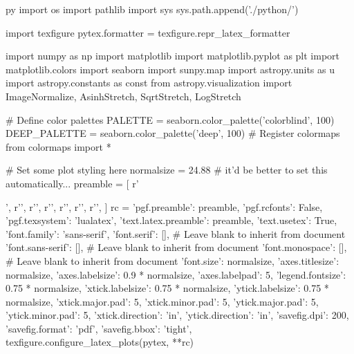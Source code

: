 \begin{pythontexcustomcode}{py}
import os
import pathlib
import sys
sys.path.append('./python/')

import texfigure
pytex.formatter = texfigure.repr_latex_formatter

import numpy as np
import matplotlib
import matplotlib.pyplot as plt
import matplotlib.colors
import seaborn
import sunpy.map
import astropy.units as u
import astropy.constants as const
from astropy.visualization import ImageNormalize, AsinhStretch, SqrtStretch, LogStretch

# Define color palettes
PALETTE = seaborn.color_palette('colorblind', 100)
DEEP_PALETTE = seaborn.color_palette('deep', 100)
# Register colormaps
from colormaps import *

# Set some plot styling here
normalsize = 24.88  # it'd be better to set this automatically...
preamble = [
	r'\usepackage{siunitx}',
	r'\DeclareSIUnit[number-unit-product={}]',
	r'\DeclareSIUnit[number-unit-product={}]',
	r'\DeclareSIUnit[number-unit-product={}]',
	r'\DeclareSIUnit[number-unit-product={}]',
	r'\DeclareSIUnit[number-unit-product={}]',
	r'\DeclareSIUnit[number-unit-product={}]',
]
rc = {
	'pgf.preamble': preamble,
	'pgf.rcfonts': False,
	'pgf.texsystem': 'lualatex',
	'text.latex.preamble': preamble,
	'text.usetex': True,
	'font.family': 'sans-serif',
	'font.serif': [], # Leave blank to inherit from document
	'font.sans-serif': [], # Leave blank to inherit from document
	'font.monospace': [], # Leave blank to inherit from document
	'font.size': normalsize,
	'axes.titlesize': normalsize,
	'axes.labelsize': 0.9 * normalsize,
	'axes.labelpad': 5,
	'legend.fontsize': 0.75 * normalsize,
	'xtick.labelsize': 0.75 * normalsize,
	'ytick.labelsize': 0.75 * normalsize,
	'xtick.major.pad': 5,
	'xtick.minor.pad': 5,
	'ytick.major.pad': 5,
	'ytick.minor.pad': 5,
	'xtick.direction': 'in',
	'ytick.direction': 'in',
	'savefig.dpi': 200,
	'savefig.format': 'pdf',
	'savefig.bbox': 'tight',
}
texfigure.configure_latex_plots(pytex, **rc)

\end{pythontexcustomcode}

